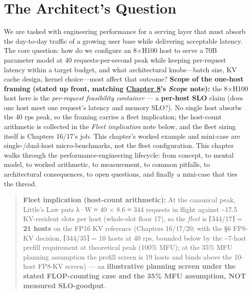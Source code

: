 \section*{The Architect's Question}\label{the-architects-question}

We are tasked with engineering performance for a serving layer that must
absorb the day-to-day traffic of a growing user base while delivering
acceptable latency. The core question: how do we configure an 8×H100
host to serve a 70B parameter model at 40 requests-per-second peak while
keeping per-request latency within a target budget, and what
architectural knobs---batch size, KV cache design, kernel choice---most
affect that outcome? \textbf{Scope of the one-host framing (stated up
front, matching \hyperref[chap:8]{Chapter 8}'s \emph{Scope} note):} the 8×H100 host here is
the \emph{per-request feasibility container} --- a \textbf{per-host SLO}
claim (does one host meet one request's latency and memory SLO?). No
single host absorbs the 40 rps peak, so the framing carries a fleet
implication; the host-count arithmetic is collected in the \emph{Fleet
implication} note below, and the fleet sizing itself is Chapters 16/17's
job. This chapter's worked example and mini-case are single-/dual-host
micro-benchmarks, not the fleet configuration. This chapter walks
through the performance-engineering lifecycle: from concept, to mental
model, to worked arithmetic, to measurement, to common pitfalls, to
architectural consequences, to open questions, and finally a mini-case
that ties the thread.

\begin{quote}
\textbf{Fleet implication (host-count arithmetic):} At the canonical
peak, Little's Law puts λ·W ≈ 40 × 8.6 ≈ 344 requests in flight against
\textasciitilde17.5 KV-resident slots per host (whole-slot floor 17), so
the \emph{fleet} is ⌈344/17⌉ = \textbf{21 hosts} on the FP16 KV
reference (Chapters 16/17/20; with the §6 FP8-KV decision, ⌈344/35⌉ = 10
hosts at 40 rps, bounded below by the \textasciitilde7-host prefill
requirement at theoretical peak (100\% MFU); at the 35\% MFU planning
assumption the prefill screen is 19 hosts and binds above the 10-host
FP8-KV screen) --- an \textbf{illustrative planning screen under the
stated FLOP-counting case and the 35\% MFU assumption, NOT measured
SLO-goodput}.
\end{quote}

\label{concept}


